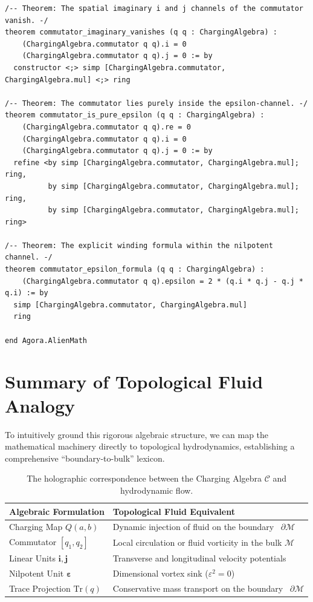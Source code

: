\documentclass[11pt,a4paper]{book}
\begin{document}
\begin{lstlisting}[language=caml, basicstyle=\ttfamily\small, backgroundcolor=\color{lightgray!10}]
/-- Theorem: The spatial imaginary i and j channels of the commutator vanish. -/
theorem commutator_imaginary_vanishes (q q : ChargingAlgebra) :
    (ChargingAlgebra.commutator q q).i = 0 
    (ChargingAlgebra.commutator q q).j = 0 := by
  constructor <;> simp [ChargingAlgebra.commutator, ChargingAlgebra.mul] <;> ring

/-- Theorem: The commutator lies purely inside the epsilon-channel. -/
theorem commutator_is_pure_epsilon (q q : ChargingAlgebra) :
    (ChargingAlgebra.commutator q q).re = 0 
    (ChargingAlgebra.commutator q q).i = 0 
    (ChargingAlgebra.commutator q q).j = 0 := by
  refine <by simp [ChargingAlgebra.commutator, ChargingAlgebra.mul]; ring, 
          by simp [ChargingAlgebra.commutator, ChargingAlgebra.mul]; ring, 
          by simp [ChargingAlgebra.commutator, ChargingAlgebra.mul]; ring>

/-- Theorem: The explicit winding formula within the nilpotent channel. -/
theorem commutator_epsilon_formula (q q : ChargingAlgebra) :
    (ChargingAlgebra.commutator q q).epsilon = 2 * (q.i * q.j - q.j * q.i) := by
  simp [ChargingAlgebra.commutator, ChargingAlgebra.mul]
  ring

end Agora.AlienMath
\end{lstlisting}

\section{Summary of Topological Fluid Analogy}
\label{sec:fluid_analogy_summary}

To intuitively ground this rigorous algebraic structure, we can map the mathematical machinery directly to topological hydrodynamics, establishing a comprehensive ``boundary-to-bulk'' lexicon.

\begin{table}[h!]
\centering
\begin{tabular}{|l|l|}
\hline
\textbf{Algebraic Formulation} & \textbf{Topological Fluid Equivalent} \\ \hline
Charging Map $Q(a, b)$ & Dynamic injection of fluid on the boundary ~$\partial \mathcal{M}$ \\ \hline
Commutator $[q_1, q_2]$ & Local circulation or fluid vorticity in the bulk $\mathcal{M}$ \\ \hline
Linear Units $\mathbf{i}, \mathbf{j}$ & Transverse and longitudinal velocity potentials \\ \hline
Nilpotent Unit $\boldsymbol{\varepsilon}$ & Dimensional vortex sink ($\varepsilon^2 = 0$) \\ \hline
Trace Projection $\text{Tr}(q)$ & Conservative mass transport on the boundary ~$\partial\mathcal{M}$ \\ \hline
\end{tabular}
\caption{The holographic correspondence between the Charging Algebra $\mathcal{C}$ and hydrodynamic flow.}
\label{tab:fluid_analogy}
\end{table}
\end{document}
